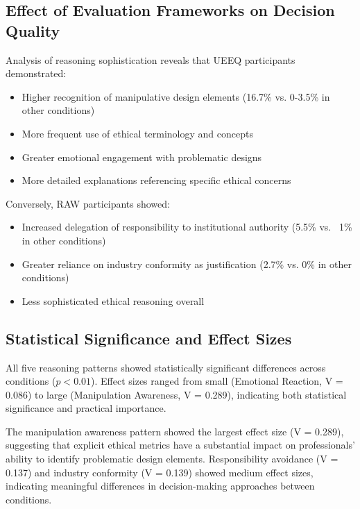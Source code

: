 \subsection{Effect of Evaluation Frameworks on Decision Quality}

Analysis of reasoning sophistication reveals that UEEQ participants demonstrated:
\begin{itemize}
\item Higher recognition of manipulative design elements (16.7\% vs. 0-3.5\% in other conditions)
\item More frequent use of ethical terminology and concepts
\item Greater emotional engagement with problematic designs
\item More detailed explanations referencing specific ethical concerns
\end{itemize}

Conversely, RAW participants showed:
\begin{itemize}
\item Increased delegation of responsibility to institutional authority (5.5\% vs. ~1\% in other conditions)
\item Greater reliance on industry conformity as justification (2.7\% vs. 0\% in other conditions)
\item Less sophisticated ethical reasoning overall
\end{itemize}

\subsection{Statistical Significance and Effect Sizes}

All five reasoning patterns showed statistically significant differences across conditions ($p < 0.01$). Effect sizes ranged from small (Emotional Reaction, V = 0.086) to large (Manipulation Awareness, V = 0.289), indicating both statistical significance and practical importance.

The manipulation awareness pattern showed the largest effect size (V = 0.289), suggesting that explicit ethical metrics have a substantial impact on professionals' ability to identify problematic design elements. Responsibility avoidance (V = 0.137) and industry conformity (V = 0.139) showed medium effect sizes, indicating meaningful differences in decision-making approaches between conditions.
